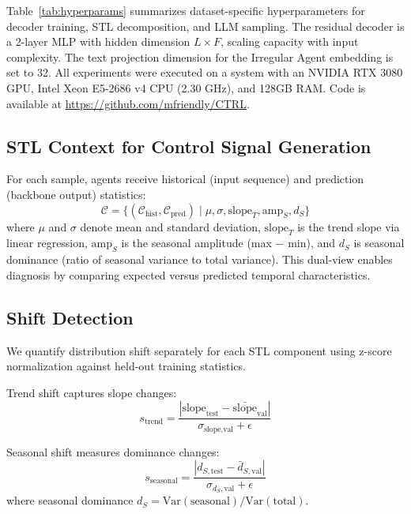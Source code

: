 Table~\ref{tab:hyperparams} summarizes dataset-specific hyperparameters for decoder training, STL decomposition, and LLM sampling. The residual decoder is a 2-layer MLP with hidden dimension $L \times F$, scaling capacity with input complexity.
The text projection dimension for the Irregular Agent embedding is set to 32.
All experiments were executed on a system with an NVIDIA RTX 3080 GPU, Intel Xeon E5-2686 v4 CPU (2.30 GHz), and 128GB RAM. Code is available at \url{https://github.com/mfriendly/CTRL}.

\subsection{STL Context for Control Signal Generation}
\label{app:stl_context}
For each sample, agents receive historical (input sequence) and prediction (backbone output) statistics:
\begin{equation}
    \mathcal{C} = \{(\mathcal{C}_\text{hist}, \mathcal{C}_\text{pred}) \mid \mu, \sigma, \text{slope}_T, \text{amp}_S, d_S\}
\end{equation}
where $\mu$ and $\sigma$ denote mean and standard deviation, $\text{slope}_T$ is the trend slope via linear regression, $\text{amp}_S$ is the seasonal amplitude (max $-$ min), and $d_S$ is seasonal dominance (ratio of seasonal variance to total variance). This dual-view enables diagnosis by comparing expected versus predicted temporal characteristics.

\subsection{Shift Detection}
\label{app:shift_detection}

We quantify distribution shift separately for each STL component using z-score normalization against held-out training statistics.

Trend shift captures slope changes:
\begin{equation}
s_\text{trend} = \frac{|\text{slope}_\text{test} - \bar{\text{slope}}_\text{val}|}{\sigma_{\text{slope,val}} + \epsilon}
\end{equation}

Seasonal shift measures dominance changes:
\begin{equation}
s_\text{seasonal} = \frac{|d_{S,\text{test}} - \bar{d}_{S,\text{val}}|}{\sigma_{d_S,\text{val}} + \epsilon}
\end{equation}
where seasonal dominance \textit{$d_S = \text{Var}(\text{seasonal}) / \text{Var}(\text{total})$}.

